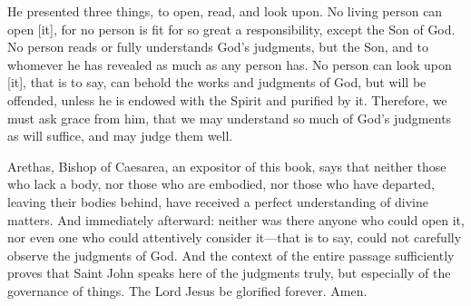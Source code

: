 He presented three things, to open, read, and look upon. No living person can open [it], for no person is fit for so great a responsibility, except the Son of God. No person reads or fully understands God’s judgments, but the Son, and to whomever he has revealed as much as any person has. No person can look upon [it], that is to say, can behold the works and judgments of God, but will be offended, unless he is endowed with the Spirit and purified by it. Therefore, we must ask grace from him, that we may understand so much of God’s judgments as will suffice, and may judge them well.

Arethas, Bishop of Caesarea, an expositor of this book, says that neither those who lack a body, nor those who are embodied, nor those who have departed, leaving their bodies behind, have received a perfect understanding of divine matters. And immediately afterward: neither was there anyone who could open it, nor even one who could attentively consider it—that is to say, could not carefully observe the judgments of God. And the context of the entire passage sufficiently proves that Saint John speaks here of the judgments truly, but especially of the governance of things. The Lord Jesus be glorified forever. Amen.

